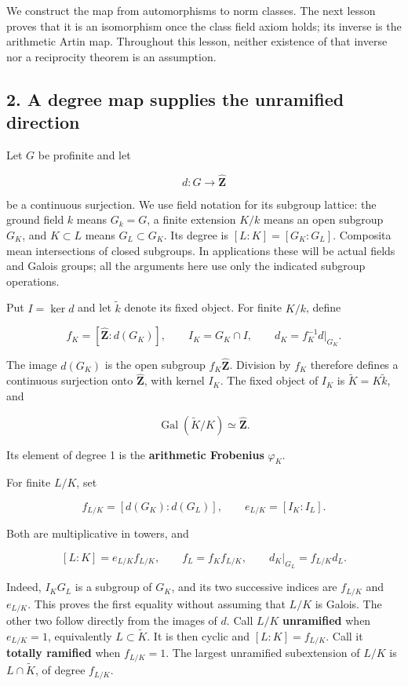 \documentclass[11pt,a4paper]{article}
\begin{document}
We construct the map from automorphisms to norm classes. The next lesson
proves that it is an isomorphism once the class field axiom holds; its
inverse is the arithmetic Artin map. Throughout this lesson, neither
existence of that inverse nor a reciprocity theorem is an assumption.

\subsection{2. A degree map supplies the unramified
direction}\label{a-degree-map-supplies-the-unramified-direction}

Let \(G\) be profinite and let

\[
d:G\longrightarrow\widehat{\mathbf Z}
\]

be a continuous surjection. We use field notation for its subgroup
lattice: the ground field \(k\) means \(G_k=G\), a finite extension
\(K/k\) means an open subgroup \(G_K\), and \(K\subset L\) means
\(G_L\subset G_K\). Its degree is \([L:K]=[G_K:G_L]\). Composita mean
intersections of closed subgroups. In applications these will be actual
fields and Galois groups; all the arguments here use only the indicated
subgroup operations.

Put \(I=\ker d\) and let \(\widetilde k\) denote its fixed object. For
finite \(K/k\), define

\[
f_K=[\widehat{\mathbf Z}:d(G_K)],\qquad
I_K=G_K\cap I,\qquad
d_K=f_K^{-1}d|_{G_K}.
\]

The image \(d(G_K)\) is the open subgroup \(f_K\widehat{\mathbf Z}\).
Division by \(f_K\) therefore defines a continuous surjection onto
\(\widehat{\mathbf Z}\), with kernel \(I_K\). The fixed object of
\(I_K\) is \(\widetilde K=K\widetilde k\), and

\[
\operatorname{Gal}(\widetilde K/K)\simeq\widehat{\mathbf Z}.
\]

Its element of degree 1 is the \textbf{arithmetic Frobenius}
\(\varphi_K\).

For finite \(L/K\), set

\[
f_{L/K}=[d(G_K):d(G_L)],\qquad
e_{L/K}=[I_K:I_L].
\]

Both are multiplicative in towers, and

\[
[L:K]=e_{L/K}f_{L/K},\qquad
f_L=f_Kf_{L/K},\qquad
d_K|_{G_L}=f_{L/K}d_L.
\tag{1}
\]

Indeed, \(I_KG_L\) is a subgroup of \(G_K\), and its two successive
indices are \(f_{L/K}\) and \(e_{L/K}\). This proves the first equality
without assuming that \(L/K\) is Galois. The other two follow directly
from the images of \(d\). Call \(L/K\) \textbf{unramified} when
\(e_{L/K}=1\), equivalently \(L\subset\widetilde K\). It is then cyclic
and \([L:K]=f_{L/K}\). Call it \textbf{totally ramified} when
\(f_{L/K}=1\). The largest unramified subextension of \(L/K\) is
\(L\cap\widetilde K\), of degree \(f_{L/K}\).
\end{document}
